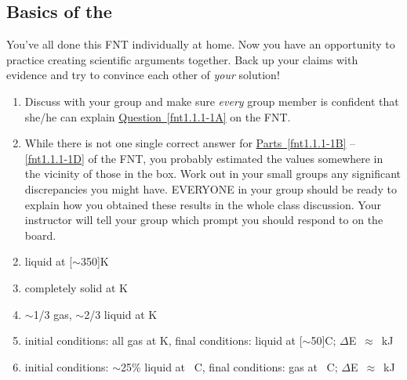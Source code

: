 \subsection{Basics of the \ThreePhaseModel{}}

\begin{fnt}
	
\end{fnt}

\noindent
You've all done this FNT individually at home. Now you have an opportunity to practice creating scientific arguments together. Back up your claims with evidence and try to convince each other of \emph{your} solution!

\begin{enumerate}
	\item Discuss with your group and make sure \emph{every} group member is confident that she/he can explain \hyperref[fnt1.1.1-1A]{Question~\ref*{fnt1.1.1-1A}} on the FNT.
	
	\item While there is not one single correct answer for \hyperref[fnt1.1.1-1B]{Parts~\ref*{fnt1.1.1-1B}} -- \hyperref[fnt1.1.1-1D]{\ref*{fnt1.1.1-1D}} of the FNT, you probably estimated the values somewhere in the vicinity of those in the box. Work out in your small groups any significant discrepancies you might have. EVERYONE in your group should be ready to explain how you obtained these results in the whole class discussion. Your instructor will tell your group which prompt you should respond to on the board.
\end{enumerate}

\begin{ans}
	\begin{enumerate}\setcounter{enumi}{1}
		\item liquid at \unit[$\sim$350]{K}
		\item completely solid at \unit[273]{K}
		\item $\sim$1/3 gas, $\sim$2/3 liquid at \unit[373]{K}
		\item initial conditions: all gas at \unit[373]{K}, final conditions: liquid at \unit[$\sim$50]{\textdegree C}; $\Delta$E~$\approx$~\unit[2470]{kJ}
		\item initial conditions: $\sim$25\% liquid at \unit[0]{\textdegree C}, final conditions: gas at \unit[100]{\textdegree C}; $\Delta$E~$\approx$~\unit[3000]{kJ}
	\end{enumerate}
\end{ans}


